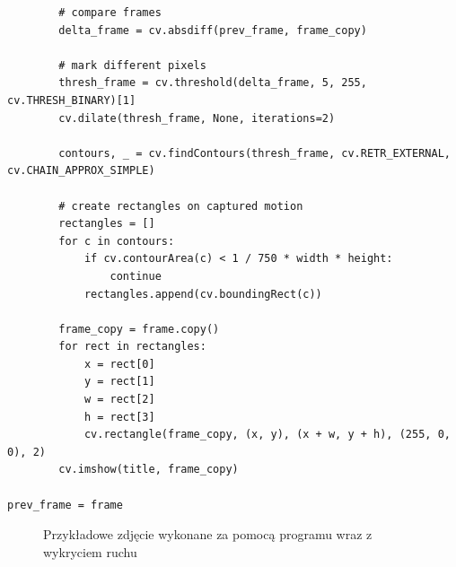 \documentclass[a4paper,12pt]{extarticle}  %
\begin{document}
\begin{enumerate}
\begin{itemize}
\begin{lstlisting}
		# compare frames
		delta_frame = cv.absdiff(prev_frame, frame_copy)
		
		# mark different pixels
		thresh_frame = cv.threshold(delta_frame, 5, 255, cv.THRESH_BINARY)[1]
		cv.dilate(thresh_frame, None, iterations=2)

		contours, _ = cv.findContours(thresh_frame, cv.RETR_EXTERNAL, cv.CHAIN_APPROX_SIMPLE)

		# create rectangles on captured motion
		rectangles = []
		for c in contours:
			if cv.contourArea(c) < 1 / 750 * width * height:
				continue
			rectangles.append(cv.boundingRect(c))

		frame_copy = frame.copy()
		for rect in rectangles:
			x = rect[0]
			y = rect[1]
			w = rect[2]
			h = rect[3]
			cv.rectangle(frame_copy, (x, y), (x + w, y + h), (255, 0, 0), 2)
		cv.imshow(title, frame_copy)

prev_frame = frame
\end{lstlisting}
\begin{figure}[H]
   \centering
   \caption{Przykładowe zdjęcie wykonane za pomocą programu wraz z wykryciem ruchu}
\end{figure}

	      \end{itemize}
\end{enumerate}
\end{document}

